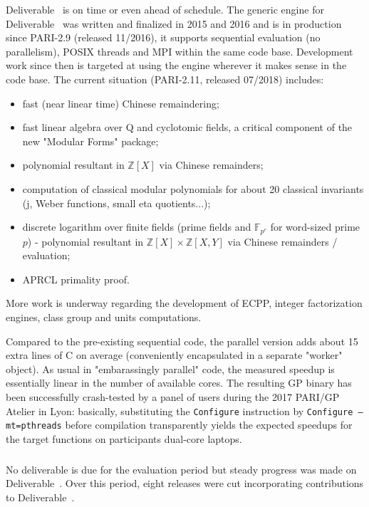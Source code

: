 Deliverable~ is on time or even ahead of schedule.
The generic engine for Deliverable~ was written and
finalized in 2015 and 2016 and is in production since PARI-2.9 (released
11/2016), it supports sequential evaluation (no parallelism), POSIX threads and
MPI within the same code base.
Development work since then is targeted at using the engine wherever it makes
sense in the code base. The current situation (PARI-2.11, released 07/2018)
includes:
\begin{itemize}
\item fast (near linear time) Chinese remaindering;
\item fast linear algebra over Q and cyclotomic fields, a critical component of
the new "Modular Forms" package;
\item polynomial resultant in $\mathbb{Z}[X]$ via Chinese remainders;
\item computation of classical modular polynomials for about 20 classical
invariants (j, Weber functions, small eta quotients...);
\item discrete logarithm over finite fields (prime fields and
$\mathbb{F}_{p^e}$ for word-sized prime $p$) - polynomial resultant in
$\mathbb{Z}[X] \times \mathbb{Z}[X,Y]$ via 
Chinese remainders / evaluation;
\item APRCL primality proof.
\end{itemize}

More work is underway regarding the development of  ECPP, integer
factorization engines, class group and units computations.

Compared to the pre-existing sequential code, the parallel version adds about 15 extra lines of
C on average (conveniently encapsulated in a separate "worker" object). As usual
in "embarassingly parallel" code, the measured speedup is essentially linear in
the number of available cores. The resulting GP binary has been successfully
crash-tested by a panel of users during the 2017 PARI/GP Atelier in Lyon:
basically, substituting the \texttt{Configure} instruction by \texttt{Configure --mt=pthreads}
before compilation transparently yields the expected speedups for the target
functions on participants dual-core laptops. 


\subparagraph{}
\label{hpc@hpc-gap}

No deliverable is due for the evaluation period but steady progress was made on
Deliverable~. Over this period, eight releases were cut
incorporating contributions to Deliverable~.

